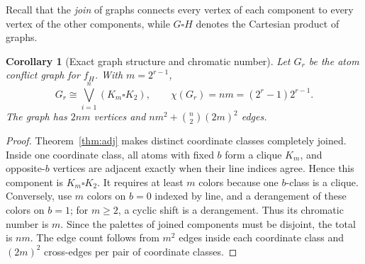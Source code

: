 \documentclass[11pt,a4paper]{article}
\newtheorem{corollary}[theorem]{Corollary}
\begin{document}
Recall that the \emph{join} of graphs connects every vertex of each component to every vertex of the other components, while $G\square H$ denotes the Cartesian product of graphs.
\begin{corollary}[Exact graph structure and chromatic number]\label{cor:chi}
Let $G_r$ be the atom conflict graph for $f_H$. With $m=2^{r-1}$,
\[
\boxed{\quad G_r\cong \bigvee_{i=1}^{n}\left(K_m\square K_2\right),
\qquad \chi(G_r)=nm=(2^r-1)2^{r-1}.\quad}
\]
The graph has $2nm$ vertices and $nm^2+\binom n2(2m)^2$ edges.
\end{corollary}
\begin{proof}
Theorem~\ref{thm:adj} makes distinct coordinate classes completely joined. Inside one coordinate class, all atoms with fixed $b$ form a clique $K_m$, and opposite-$b$ vertices are adjacent exactly when their line indices agree. Hence this component is $K_m\square K_2$. It requires at least $m$ colors because one $b$-class is a clique. Conversely, use $m$ colors on $b=0$ indexed by line, and a derangement of these colors on $b=1$; for $m\ge2$, a cyclic shift is a derangement. Thus its chromatic number is $m$. Since the palettes of joined components must be disjoint, the total is $nm$. The edge count follows from $m^2$ edges inside each coordinate class and $(2m)^2$ cross-edges per pair of coordinate classes.
\end{proof}
\end{document}

